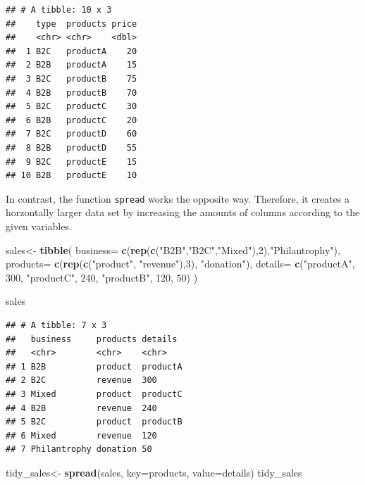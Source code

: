 \documentclass[]{report}
\newenvironment{Shaded}{\begin{snugshade}}{\end{snugshade}}
\newcommand{\KeywordTok}[1]{\textcolor[rgb]{0.13,0.29,0.53}{\textbf{#1}}}
\newcommand{\DataTypeTok}[1]{\textcolor[rgb]{0.13,0.29,0.53}{#1}}
\newcommand{\DecValTok}[1]{\textcolor[rgb]{0.00,0.00,0.81}{#1}}
\newcommand{\StringTok}[1]{\textcolor[rgb]{0.31,0.60,0.02}{#1}}
\newcommand{\NormalTok}[1]{#1}
\begin{document}
\begin{verbatim}
## # A tibble: 10 x 3
##    type  products price
##    <chr> <chr>    <dbl>
##  1 B2C   productA    20
##  2 B2B   productA    15
##  3 B2C   productB    75
##  4 B2B   productB    70
##  5 B2C   productC    30
##  6 B2B   productC    20
##  7 B2C   productD    60
##  8 B2B   productD    55
##  9 B2C   productE    15
## 10 B2B   productE    10
\end{verbatim}

In contrast, the function \texttt{spread} works the opposite way.
Therefore, it creates a horzontally larger data set by increasing the
amounts of columns according to the given variables.

\begin{Shaded}
\begin{Highlighting}[]
\NormalTok{sales<-}\StringTok{ }\KeywordTok{tibble}\NormalTok{(}
  \DataTypeTok{business=} \KeywordTok{c}\NormalTok{(}\KeywordTok{rep}\NormalTok{(}\KeywordTok{c}\NormalTok{(}\StringTok{"B2B"}\NormalTok{,}\StringTok{"B2C"}\NormalTok{,}\StringTok{"Mixed"}\NormalTok{),}\DecValTok{2}\NormalTok{),}\StringTok{"Philantrophy"}\NormalTok{),}
  \DataTypeTok{products=} \KeywordTok{c}\NormalTok{(}\KeywordTok{rep}\NormalTok{(}\KeywordTok{c}\NormalTok{(}\StringTok{"product"}\NormalTok{, }\StringTok{"revenue"}\NormalTok{),}\DecValTok{3}\NormalTok{), }\StringTok{"donation"}\NormalTok{),}
  \DataTypeTok{details=} \KeywordTok{c}\NormalTok{(}\StringTok{"productA"}\NormalTok{, }\DecValTok{300}\NormalTok{, }\StringTok{"productC"}\NormalTok{, }\DecValTok{240}\NormalTok{, }\StringTok{"productB"}\NormalTok{, }\DecValTok{120}\NormalTok{, }\DecValTok{50}\NormalTok{)}
\NormalTok{        )}

\NormalTok{sales}
\end{Highlighting}
\end{Shaded}

\begin{verbatim}
## # A tibble: 7 x 3
##   business     products details 
##   <chr>        <chr>    <chr>   
## 1 B2B          product  productA
## 2 B2C          revenue  300     
## 3 Mixed        product  productC
## 4 B2B          revenue  240     
## 5 B2C          product  productB
## 6 Mixed        revenue  120     
## 7 Philantrophy donation 50
\end{verbatim}

\begin{Shaded}
\begin{Highlighting}[]
\NormalTok{tidy_sales<-}\StringTok{ }\KeywordTok{spread}\NormalTok{(sales, }\DataTypeTok{key=}\NormalTok{products, }\DataTypeTok{value=}\NormalTok{details)}
\NormalTok{tidy_sales}
\end{Highlighting}
\end{Shaded}
\end{document}
